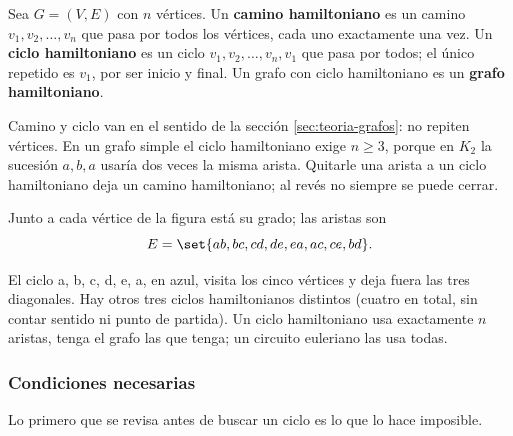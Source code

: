 \documentclass[11pt,letterpaper]{article}
\begin{document}
\begin{definicion}
  \label{def:hamilton-camino}
  Sea $G = (V, E)$ con $n$ vértices. Un \textbf{camino hamiltoniano}
  es un camino $v_1, v_2, \dots, v_n$ que pasa por todos los
  vértices, cada uno exactamente una vez. Un \textbf{ciclo
  hamiltoniano} es un ciclo $v_1, v_2, \dots, v_n, v_1$ que pasa por
  todos; el único repetido es $v_1$, por ser inicio y final. Un grafo
  con ciclo hamiltoniano es un \textbf{grafo hamiltoniano}.
\end{definicion}

Camino y ciclo van en el sentido de la sección
\ref{sec:teoria-grafos}: no repiten vértices. En un grafo simple el
ciclo hamiltoniano exige $n \ge 3$, porque en $K_2$ la sucesión
$a, b, a$ usaría dos veces la misma arista. Quitarle una arista a un
ciclo hamiltoniano deja un camino hamiltoniano; al revés no siempre
se puede cerrar.

\begin{ejemplo}
  \label{ej:hamilton-pentagono}
  Junto a cada vértice de la figura está su grado; las aristas son
  \[
    E = \set{ab, bc, cd, de, ea, ac, ce, bd} .
  \]
  \begin{center}
  \end{center}
  El ciclo a, b, c, d, e, a, en azul, visita los cinco vértices y deja
  fuera las tres diagonales. Hay otros tres ciclos hamiltonianos
  distintos (cuatro en total, sin contar sentido ni punto de partida).
  Un ciclo hamiltoniano usa exactamente $n$ aristas, tenga el grafo
  las que tenga; un circuito euleriano las usa todas.
\end{ejemplo}

\subsubsection*{Condiciones necesarias}

Lo primero que se revisa antes de buscar un ciclo es lo que lo hace
imposible.
\end{document}
